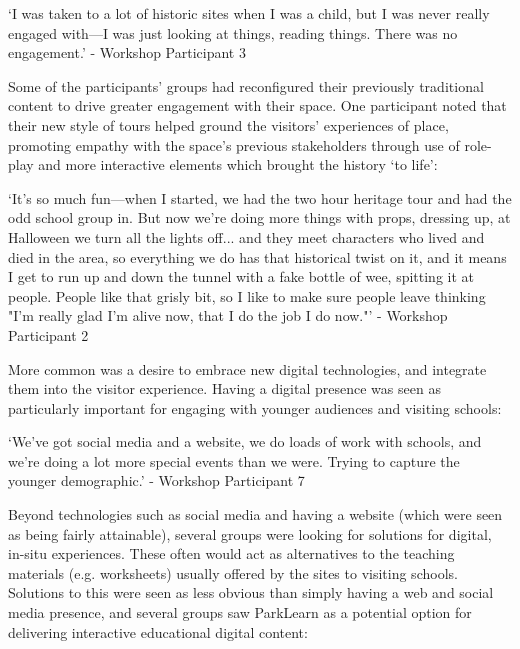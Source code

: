\begin{displayquote}
`I was taken to a lot of historic sites when I was a child, but I was never really engaged with---I was just looking at things, reading things. There was no engagement.' - Workshop Participant 3
\end{displayquote}

Some of the participants' groups had reconfigured their previously traditional content to drive greater engagement with their space. One participant noted that their new style of tours helped ground the visitors' experiences of place, promoting empathy with the space's previous stakeholders through use of role-play and more interactive elements which brought the history `to life':

\begin{displayquote}
`It's so much fun---when I started, we had the two hour heritage tour and had the odd school group in. But now we're doing more things with props, dressing up, at Halloween we turn all the lights off... and they meet characters who lived and died in the area, so everything we do has that historical twist on it, and it means I get to run up and down the tunnel with a fake bottle of wee, spitting it at people. People like that grisly bit, so I like to make sure people leave thinking "I'm really glad I'm alive now, that I do the job I do now."' - Workshop Participant 2
\end{displayquote}

More common was a desire to embrace new digital technologies, and integrate them into the visitor experience. Having a digital presence was seen as particularly important for engaging with younger audiences and visiting schools:

\begin{displayquote}
`We've got social media and a website, we do loads of work with schools, and we're doing a lot more special events than we were. Trying to capture the younger demographic.' - Workshop Participant 7
\end{displayquote}

Beyond technologies such as social media and having a website (which were seen as being fairly attainable), several groups were looking for solutions for digital, in-situ experiences. These often would act as alternatives to the teaching materials (e.g. worksheets) usually offered by the sites to visiting schools. Solutions to this were seen as less obvious than simply having a web and social media presence, and several groups saw ParkLearn as a potential option for delivering interactive educational digital content:

